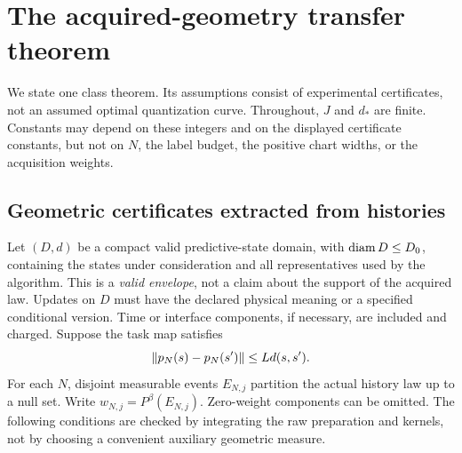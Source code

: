 \section{The acquired-geometry transfer theorem}\label{sec:main}
We state one class theorem. Its assumptions consist of experimental certificates, not an assumed optimal quantization curve. Throughout, $J$ and $d_*$ are finite. Constants may depend on these integers and on the displayed certificate constants, but not on $N$, the label budget, the positive chart widths, or the acquisition weights.

\subsection{Geometric certificates extracted from histories}
Let $(D,d)$ be a compact valid predictive-state domain, with $\operatorname{diam} D\le D_0$, containing the states under consideration and all representatives used by the algorithm. This is a \emph{valid envelope}, not a claim about the support of the acquired law. Updates on $D$ must have the declared physical meaning or a specified conditional version. Time or interface components, if necessary, are included and charged. Suppose the task map satisfies
\begin{equation}\label{eq:task-lip}
 \lVert p_N(s)-p_N(s')\rVert\le Ld(s,s').
\end{equation}
For each $N$, disjoint measurable events $E_{N,j}$ partition the actual history law up to a null set. Write $w_{N,j}=P^\beta(E_{N,j})$. Zero-weight components can be omitted. The following conditions are checked by integrating the raw preparation and kernels, not by choosing a convenient auxiliary geometric measure.

